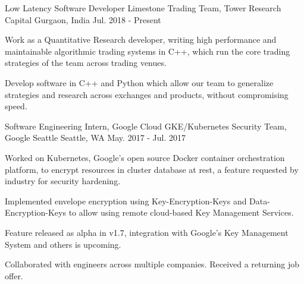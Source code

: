 
\vspace{-0.2cm}


\begin{cventries}

  \cventry
  {Low Latency Software Developer}
  {Limestone Trading Team, Tower Research Capital}
  {Gurgaon, India}
  {Jul. 2018 - Present}
  {
    \begin{cvitems}
    \setlength\itemsep{0.1cm}
    \item {Work as a Quantitative Research developer, writing high performance and maintainable algorithmic trading systems in C++, which run the core trading strategies of the team across trading venues.}
    \item {Develop software in C++ and Python which allow our team to generalize strategies and research across \mbox{exchanges} and products, without compromising speed.}
    \end{cvitems}
  }

  \cventry
  {Software Engineering Intern, Google Cloud}
  {GKE/Kubernetes Security Team, Google Seattle}
  {Seattle, WA}
  {May. 2017 - Jul. 2017}
  {
    \begin{cvitems}
    \setlength\itemsep{0.1cm}
    \item {Worked on Kubernetes, Google's open source Docker container orchestration platform, to encrypt resources in cluster database at rest, a feature requested by industry for security hardening.}
    \item {Implemented envelope encryption using Key-Encryption-Keys and Data-Encryption-Keys to allow using remote cloud-based Key Management Services.}
    \item {Feature released as alpha in v1.7, integration with Google's Key Management System and others is upcoming.}
    \item {Collaborated with engineers across multiple companies. Received a returning job offer.}
    \end{cvitems}
  }


\end{cventries}
